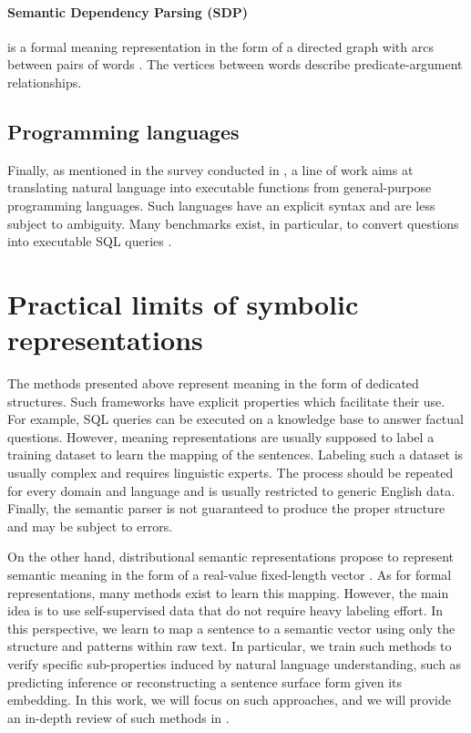 \paragraph{Semantic Dependency Parsing (SDP)} is a formal meaning representation in the form of a directed graph with arcs between pairs of words \parencite{oepen_15}. The vertices between words describe predicate-argument relationships. 

\subsection{Programming languages}

Finally, as mentioned in the survey conducted in \textcite{kamath_19}, a line of work aims at translating natural language into executable functions from general-purpose programming languages. Such languages have an explicit syntax and are less subject to ambiguity. Many benchmarks exist, in particular, to convert questions into executable SQL queries \parencite{dahl_94, radev_18}.

\section{Practical limits of symbolic representations}

The methods presented above represent meaning in the form of dedicated structures. Such frameworks have explicit properties which facilitate their use. For example, SQL queries can be executed on a knowledge base to answer factual questions. However, meaning representations are usually supposed to label a training dataset to learn the mapping of the sentences. Labeling such a dataset is usually complex and requires linguistic experts. The process should be repeated for every domain and language and is usually restricted to generic English data. Finally, the semantic parser is not guaranteed to produce the proper structure and may be subject to errors.

On the other hand, distributional semantic representations propose to represent semantic meaning in the form of a real-value fixed-length vector \parencite{jurafsky_2009}. As for formal representations, many methods exist to learn this mapping. However, the main idea is to use self-supervised data that do not require heavy labeling effort. In this perspective, we learn to map a sentence to a semantic vector using only the structure and patterns within raw text. In particular, we train such methods to verify specific sub-properties induced by natural language understanding, such as predicting inference or reconstructing a sentence surface form given its embedding. In this work, we will focus on such approaches, and we will provide an in-depth review of such methods in .

